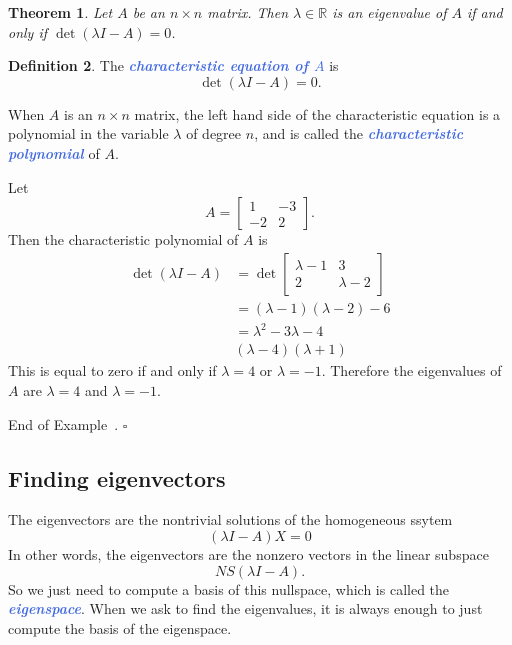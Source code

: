 \documentclass[10pt]{article}
\newcommand{\demph}[1]{\textcolor{RoyalBlue}{\textbf{\slshape #1}}} %
\newtheorem{theorem}{Theorem}
\theoremstyle{definition}
\newtheorem{definition}[theorem]{Definition}
\newtheorem{example}[theorem]{Example}
\renewenvironment{example}
{\begin{oldexample}}
  {\par\smallskip\hfill   End of Example~\theexample. $\square$    \par\end{oldexample}}
\newcommand{\R}{\mathbb{R}}           %
\begin{document}
\begin{theorem}
  Let $A$ be an $n\times n$ matrix. Then $\lambda\in \R$ is an eigenvalue of
  $A$ if and only if $\det(\lambda I-A)=0$.
\end{theorem}


\begin{definition}
  The \demph{characteristic equation of $A$ } is
  \begin{equation*}
    \det(\lambda I-A)=0.
  \end{equation*}
\end{definition}
When $A$ is an $n\times n$ matrix, the left hand side of the characteristic
equation is a polynomial in the variable $\lambda$ of degree $n$, and is
called the \demph{characteristic polynomial} of $A$.


\begin{example}
  Let
  \begin{equation*}
    A =
    \begin{bmatrix}
      1&-3\\-2&2
    \end{bmatrix}.
  \end{equation*}
  Then the characteristic polynomial of $A$ is
  \begin{align*}
    \det(\lambda I-A) 
    &= \det
      \begin{bmatrix}
        \lambda-1& 3\\
        2& \lambda-2
      \end{bmatrix} \\
    &=(\lambda-1)(\lambda-2)-6\\
    &=\lambda^{2}-3\lambda-4\\
    &(\lambda-4)(\lambda+1)
  \end{align*}
  This is equal to zero if and only if $\lambda=4$ or $\lambda=-1$. Therefore
  the eigenvalues of $A$ are $\lambda=4$ and $\lambda=-1.$ 
\end{example}


\subsection{Finding eigenvectors}

The eigenvectors are the nontrivial solutions of the homogeneous ssytem
\begin{equation*}
  (\lambda I-A)X =0
\end{equation*} 
In other words, the eigenvectors are the nonzero vectors in the linear
subspace
\begin{equation*}
  NS(\lambda I-A).
\end{equation*}
So we just need to compute a basis of this nullspace, which is called the
\demph{eigenspace}. When we ask to find the eigenvalues, it is always enough
to just compute the basis of the eigenspace.
\end{document}
